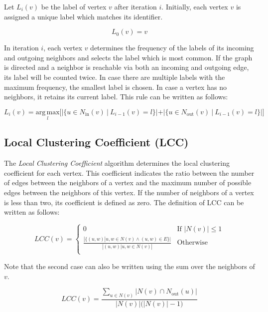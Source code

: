 Let $L_i(v)$ be the label of vertex $v$ after iteration $i$. Initially, each vertex $v$ is assigned a unique label which matches its identifier.

\begin{equation}
L_0(v) = v
\end{equation}

In iteration $i$, each vertex $v$ determines the frequency of the labels of its incoming and outgoing neighbors and selects the label which is most common.  If the graph is directed and a neighbor is reachable via both an incoming and outgoing edge, its label will be counted twice. In case there are multiple labels with the maximum frequency, the smallest label is chosen. In case a vertex has no neighbors, it retains its current label. This rule can be written as follows:

\begin{equation}
L_i(v) = \underset{l}{\mathrm{arg\,max}} \Big[ |\{ u \in N_\mathrm{in}(v)~|~L_{i-1}(v) = l \}| + |\{ u \in N_\mathrm{out}(v)~|~L_{i-1}(v) = l \}| \Big]
\end{equation}


\subsection{Local Clustering Coefficient (LCC)}
The \emph{Local Clustering Coefficient} algorithm determines the local clustering coefficient for each vertex. This coefficient indicates the ratio between the number of edges between the neighbors of a vertex and the maximum number of possible edges between the neighbors of this vertex. If the number of neighbors of a vertex is less than two, its coefficient is defined as zero. The definition of LCC can be written as follows:

\begin{equation}
LCC(v) = \begin{cases}
0 & \text{If } |N(v)| \leq 1 \\
\frac{|\{(u, w) | u, w \in N(v) \wedge (u, w) \in E\}|}
{|{(u,w) | u, w \in N(v)}|} & \text{Otherwise} \\
\end{cases}
\end{equation}

Note that the second case can also be written using the sum over the neighbors of $v$.

\begin{equation}
LCC(v) = \frac{\sum_{u \in N(v)} |N(v) \cap N_\mathrm{out}(u)|}{|N(v)| \big( |N(v)| - 1 \big)}
\end{equation}


